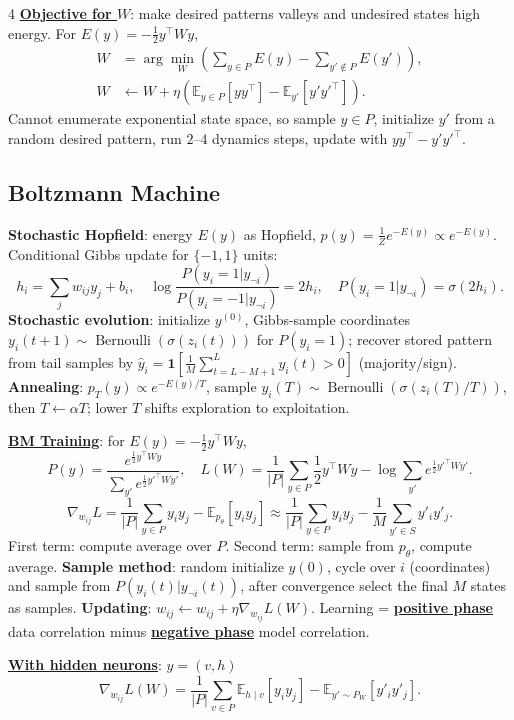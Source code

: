 \documentclass{article}
\newcommand{\key}[1]{\textbf{#1}}
\newcommand{\lowterm}[1]{\textbf{\underline{#1}}}
\newcommand{\E}{\mathbb{E}}
\newcommand{\1}{\mathbf 1}
\begin{document}
\begin{multicols*}{4}
\lowterm{Objective for $W$}: make desired patterns valleys and undesired states high energy. For $E(y)=-\frac12y^\top Wy$,
\[
\begin{aligned}
W&=\arg\min_W\left(\sum_{y\in P}E(y)-\sum_{y'\notin P}E(y')\right),\\
W&\leftarrow W+\eta\left(\E_{y\in P}[yy^\top]-\E_{y'}[y'y'^\top]\right).
\end{aligned}
\]
Cannot enumerate exponential state space, so sample $y\in P$, initialize $y'$ from a random desired pattern, run $2$--$4$ dynamics steps, update with $yy^\top-y'y'^\top$.

\subsection{Boltzmann Machine}
\key{Stochastic Hopfield}: energy $E(y)$ as Hopfield, $p(y)=\frac{1}{Z}e^{-E(y)}\propto e^{-E(y)}$. Conditional Gibbs update for $\{-1,1\}$ units:
\[
h_i=\sum_jw_{ij}y_j+b_i,\quad
\log\frac{P(y_i=1|y_{\neg i})}{P(y_i=-1|y_{\neg i})}=2h_i,\quad
P(y_i=1|y_{\neg i})=\sigma(2h_i).
\]
\key{Stochastic evolution}: initialize $y^{(0)}$, Gibbs-sample coordinates $y_i(t+1)\sim\operatorname{Bernoulli}(\sigma(z_i(t)))$ for $P(y_i=1)$; recover stored pattern from tail samples by $\hat y_i=\mathbf1[\frac1M\sum_{t=L-M+1}^Ly_i(t)>0]$ (majority/sign).
\key{Annealing}: $p_T(y)\propto e^{-E(y)/T}$, sample $y_i(T)\sim\operatorname{Bernoulli}(\sigma(z_i(T)/T))$, then $T\leftarrow\alpha T$; lower $T$ shifts exploration to exploitation. 

\lowterm{BM Training}: for $E(y)=-\frac12y^\top Wy$,
\[
P(y)=\frac{e^{\frac12y^\top Wy}}{\sum_{y'}e^{\frac12y'^\top Wy'}},\quad
L(W)=\frac1{|P|}\sum_{y\in P}\frac12y^\top Wy-\log\sum_{y'}e^{\frac12y'^\top Wy'}.
\]
\[
\nabla_{w_{ij}}L=\frac1{|P|}\sum_{y\in P}y_iy_j-\E_{p_\theta}[y_iy_j]
\approx\frac1{|P|}\sum_{y\in P}y_iy_j-\frac1M\sum_{y'\in S}y'_iy'_j.
\]
First term: compute average over $P$. Second term: sample from $p_\theta$, compute average. \key{Sample method}: random initialize $y(0)$, cycle over $i$ (coordinates) and sample from $P(y_i(t)|y_{\lnot i}(t))$, after convergence select the final $M$ states as samples. \key{Updating}: $w_{ij}\gets w_{ij}+\eta \nabla_{w_{ij}}L(W)$.
Learning = \lowterm{positive phase} data correlation minus \lowterm{negative phase} model correlation. 

\lowterm{With hidden neurons}: $y=(v,h)$
\[
\nabla_{w_{ij}} L(W)=\frac{1}{|P|}\sum_{v\in P} \E_{h\mid v}[y_iy_j]-\E_{y'\sim P_W}[y'_iy'_j].
\]


\end{multicols*}
\end{document}
